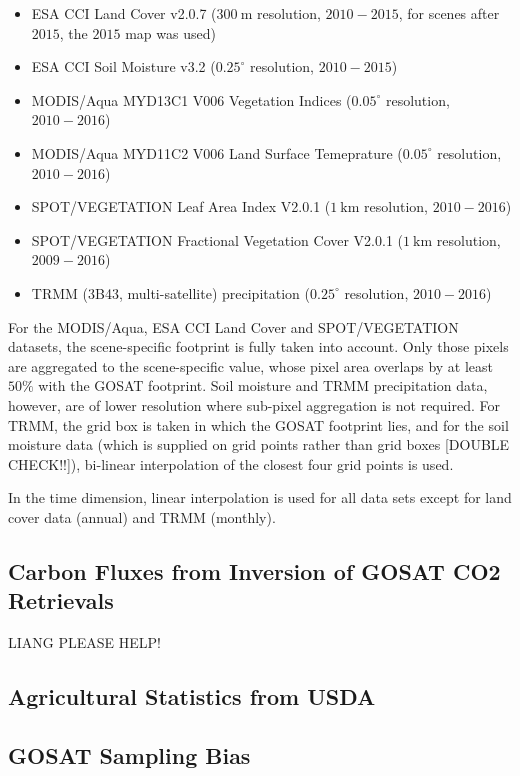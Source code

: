 \documentclass[review, a4paper, 10pt, times]{elsarticle}
\begin{document}
\begin{itemize}
\item ESA CCI Land Cover v2.0.7 ($300\:\mathrm{m}$ resolution, $2010-2015$, for scenes after $2015$, the $2015$ map was used) \citep{Bontemps2013}
\item ESA CCI Soil Moisture v3.2 ($0.25^\circ$ resolution, $2010-2015$) \citep{Dorigo2017}
\item MODIS/Aqua MYD13C1 V006 Vegetation Indices ($0.05^\circ$ resolution, $2010-2016$) \citep{MYD13C1}
\item MODIS/Aqua MYD11C2 V006 Land Surface Temeprature ($0.05^\circ$ resolution, $2010-2016$) \citep{MYD11C2}
\item SPOT/VEGETATION Leaf Area Index V2.0.1 ($1\:\mathrm{km}$ resolution, $2010-2016$)
\item SPOT/VEGETATION Fractional Vegetation Cover V2.0.1 ($1\:\mathrm{km}$ resolution, $2009-2016$)
\item TRMM (3B43, multi-satellite) precipitation ($0.25^\circ$ resolution, $2010-2016$)
\end{itemize}

For the MODIS/Aqua, ESA CCI Land Cover and SPOT/VEGETATION datasets, the scene-specific footprint is fully taken into account. Only those pixels are aggregated to the scene-specific value, whose pixel area overlaps by at least $50\%$ with the GOSAT footprint. Soil moisture and TRMM precipitation data, however, are of lower resolution where sub-pixel aggregation is not required. For TRMM, the grid box is taken in which the GOSAT footprint lies, and for the soil moisture data (which is supplied on grid points rather than grid boxes [DOUBLE CHECK!!]), bi-linear interpolation of the closest four grid points is used.

In the time dimension, linear interpolation is used for all data sets except for land cover data (annual) and TRMM (monthly).


\subsection{Carbon Fluxes from Inversion of GOSAT CO2 Retrievals}
\label{sec:fluxes}
LIANG PLEASE HELP!

\subsection{Agricultural Statistics from USDA}
\label{sec:usda}

\subsection{GOSAT Sampling Bias}
\label{sec:sampling_bias}
\end{document}
